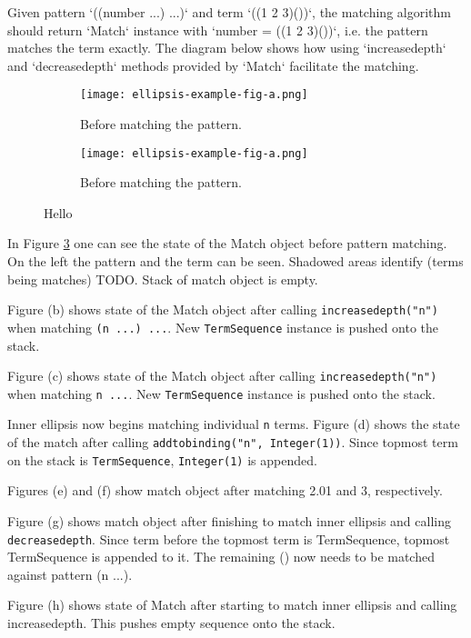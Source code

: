 Given pattern `((number ...) ...)` and term `((1 2 3)())`, the matching algorithm should return `Match` instance with `number = ((1 2 3)())`, i.e. the pattern matches the term exactly. The diagram below shows how using `increasedepth` and `decreasedepth` methods provided by `Match` facilitate the matching. 

\begin{figure}[H]
\begin{subfigure}{0.5\linewidth}
	\texttt{[image: ellipsis-example-fig-a.png]}
	\caption{Before matching the pattern.}
	\label{ellipsis-example-fig-a}
\end{subfigure}
\begin{subfigure}{0.5\linewidth}
	\texttt{[image: ellipsis-example-fig-a.png]}
	\caption{Before matching the pattern.}
	\label{ellipsis-example-fig-a}
\end{subfigure}

\caption{Hello}
\end{figure}
In Figure \ref{ellipsis-example-fig-a} one can see the state of the Match object before pattern matching. On the left the pattern and the term can be seen. Shadowed areas identify (terms being matches) TODO.  Stack of match object is empty.

Figure (b) shows state of the Match object after calling \texttt{increasedepth("n")} when matching \texttt{(n ...) ...}. New \texttt{TermSequence} instance is pushed onto the stack.

Figure (c) shows state of the Match object after calling \texttt{increasedepth("n")} when matching \texttt{n ...}. New \texttt{TermSequence} instance is pushed onto the stack.

Inner ellipsis now begins matching individual \texttt{n} terms. Figure (d) shows the state of the match after calling \texttt{addtobinding("n", Integer(1))}. Since topmost term on the stack is \texttt{TermSequence}, \texttt{Integer(1)} is appended.

Figures (e) and (f) show match object after matching 2.01 and 3, respectively.

Figure (g) shows match object after finishing to match inner ellipsis and calling \texttt{decreasedepth}. Since term before the topmost term is TermSequence, topmost TermSequence is appended to it. The remaining () now needs to be matched against pattern (n ...).

Figure (h) shows state of Match after starting to match inner ellipsis and calling increasedepth. This pushes empty sequence onto the stack.

